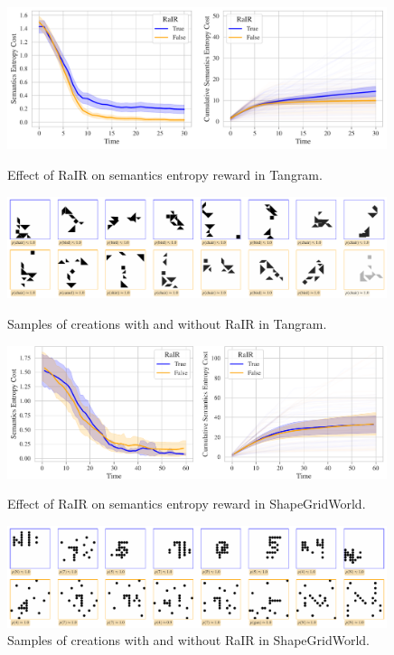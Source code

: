 \begin{figure}[h]
    \centering
    \includegraphics[width=0.99\textwidth]{images/rair_comparison.pdf}
    \caption{Effect of RaIR on semantics entropy reward in Tangram.}
    \label{fig:rair}
    \vspace{12pt}
    \includegraphics[width=0.99\textwidth]{images/rair_samples.pdf}
    \caption{Samples of creations with and without RaIR in Tangram.}
    \label{fig:rair-samples}
    \vspace{12pt}
    \includegraphics[width=0.99\textwidth]{images/rair_comparison_sgw_categories_cropped.pdf}
    \caption{Effect of RaIR on semantics entropy reward in ShapeGridWorld.}
    \label{fig:rair-sgw}
    \vspace{12pt}
    \includegraphics[width=0.99\textwidth]{images/rair_samples_sgw_categories.pdf}
    \caption[Samples of creations with and without RaIR in ShapeGridWorld.]{Samples of creations with and without RaIR in ShapeGridWorld. %
    }
    \label{fig:rair-samples-sgw}
\end{figure}

